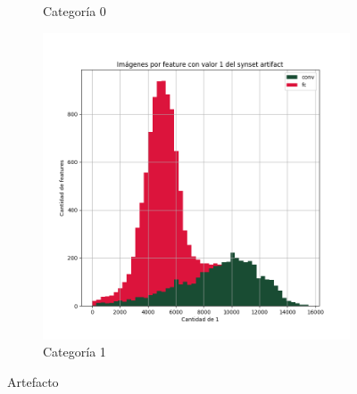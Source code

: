 \documentclass[12,twoside]{TFG-GM}
\theoremstyle{definition}
\theoremstyle{remark}
\begin{document}
\begin{figure}[ht]
\begin{subfigure}[b]{0.3\textwidth}
		\caption{Categoría 0}
	\end{subfigure}
	\begin{subfigure}[b]{0.3\textwidth}
		\includegraphics[width=\textwidth]  {Images/plots/25/synsets/Images_per_feature_of_1_category_artifactall_layers.png}
		\caption{Categoría 1}
	\end{subfigure}       
	\caption{Artefacto}
\end{figure}
\end{document}
